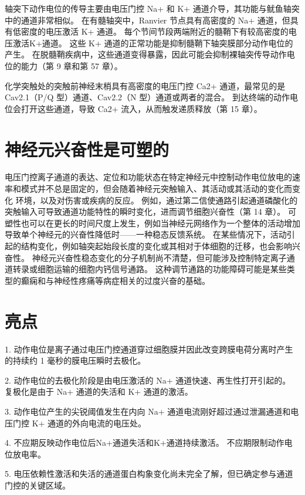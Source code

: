 轴突下动作电位的传导主要由电压门控 Na+ 和 K+ 通道介导，其功能与鱿鱼轴突中的通道非常相似。 在有髓轴突中，Ranvier 节点具有高密度的 Na+ 通道，但具有低密度的电压激活 K+ 通道。 每个节间节段两端附近的髓鞘下有较高密度的电压激活K+通道。 这些 K+ 通道的正常功能是抑制髓鞘下轴突膜部分动作电位的产生。 在脱髓鞘疾病中，这些通道变得暴露，因此可能会抑制裸轴突传导动作电位的能力（第 9 章和第 57 章）。

化学突触处的突触前神经末梢具有高密度的电压门控 Ca2+ 通道，最常见的是 Cav2.1（P/Q 型）通道、Cav2.2（N 型）通道或两者的混合。 到达终端的动作电位会打开这些通道，导致 Ca2+ 流入，从而触发递质释放（第 15 章）。


\section{神经元兴奋性是可塑的}

电压门控离子通道的表达、定位和功能状态在特定神经元中控制动作电位放电的速率和模式并不总是固定的，但会随着神经元突触输入、其活动或其活动的变化而变化 环境，以及对伤害或疾病的反应。 例如，通过第二信使通路引起通道磷酸化的突触输入可导致通道功能特性的瞬时变化，进而调节细胞兴奋性（第 14 章）。 可塑性也可以在更长的时间尺度上发生，例如当神经元网络作为一个整体的活动增加导致单个神经元的兴奋性降低时——一种稳态反馈系统。 在某些情况下，活动引起的结构变化，例如轴突起始段长度的变化或其相对于体细胞的迁移，也会影响兴奋性。 神经元兴奋性稳态变化的分子机制尚不清楚，但可能涉及控制特定离子通道转录或细胞运输的细胞内钙信号通路。 这种调节通路的功能障碍可能是某些类型的癫痫和与神经性疼痛等病症相关的过度兴奋的基础。




\section{亮点}

1. 动作电位是离子通过电压门控通道穿过细胞膜并因此改变跨膜电荷分离时产生的持续约 1 毫秒的膜电压瞬时去极化。 

2. 动作电位的去极化阶段是由电压激活的 Na+ 通道快速、再生性打开引起的。 复极化是由于 Na+ 通道的失活和 K+ 通道的激活。 

3. 动作电位产生的尖锐阈值发生在内向 Na+ 通道电流刚好超过通过泄漏通道和电压门控 K+ 通道的外向电流的电压处。 

4. 不应期反映动作电位后Na+通道失活和K+通道持续激活。 不应期限制动作电位放电率。 

5. 电压依赖性激活和失活的通道蛋白构象变化尚未完全了解，但已确定参与通道门控的关键区域。 

